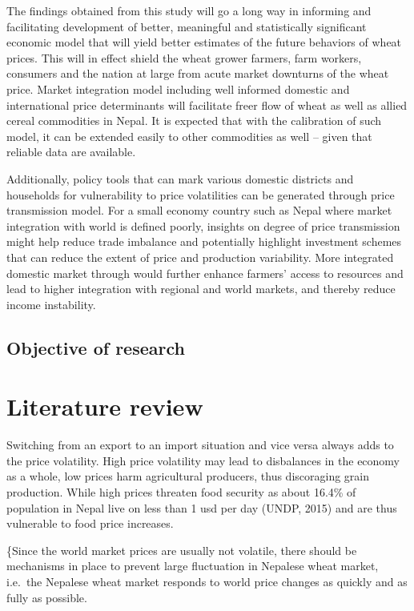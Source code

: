 \documentclass[12pt,]{article}
\begin{document}
The findings obtained from this study will go a long way in informing and facilitating development of better, meaningful and statistically significant economic model that will yield better estimates of the future behaviors of wheat prices. This will in effect shield the wheat grower farmers, farm workers, consumers and the nation at large from acute market downturns of the wheat price. Market integration model including well informed domestic and international price determinants will facilitate freer flow of wheat as well as allied cereal commodities in Nepal. It is expected that with the calibration of such model, it can be extended easily to other commodities as well -- given that reliable data are available.

Additionally, policy tools that can mark various domestic districts and households for vulnerability to price volatilities can be generated through price transmission model. For a small economy country such as Nepal where market integration with world is defined poorly, insights on degree of price transmission might help reduce trade imbalance and potentially highlight investment schemes that can reduce the extent of price and production variability. More integrated domestic market through would further enhance farmers' access to resources and lead to higher integration with regional and world markets, and thereby reduce income instability.

\hypertarget{objective-of-research}{%
\subsection{Objective of research}\label{objective-of-research}}

\hypertarget{literature-review}{%
\section{Literature review}\label{literature-review}}

Switching from an export to an import situation and vice versa always adds to the price volatility. High price volatility may lead to disbalances in the economy as a whole, low prices harm agricultural producers, thus discoraging grain production. While high prices threaten food security as about 16.4\% of population in Nepal live on less than 1 usd per day (UNDP, 2015) and are thus vulnerable to food price increases.

\{Since the world market prices are usually not volatile, there should be mechanisms in place to prevent large fluctuation in Nepalese wheat market, i.e.~the Nepalese wheat market responds to world price changes as quickly and as fully as possible.
\end{document}
